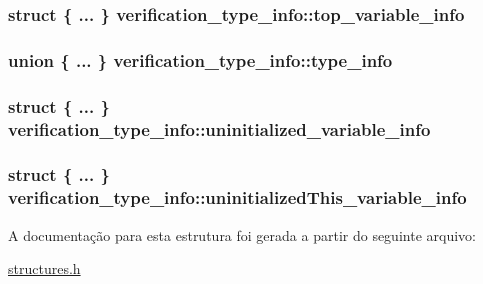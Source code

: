 \subsubsection[{\texorpdfstring{top\+\_\+variable\+\_\+info}{top_variable_info}}]{\setlength{\rightskip}{0pt plus 5cm}struct \{ ... \}   verification\+\_\+type\+\_\+info\+::top\+\_\+variable\+\_\+info}\hypertarget{structverification__type__info_ae8a25f3b3f2824a904c772ecbbd249e1}{}\label{structverification__type__info_ae8a25f3b3f2824a904c772ecbbd249e1}
\subsubsection[{\texorpdfstring{type\+\_\+info}{type_info}}]{\setlength{\rightskip}{0pt plus 5cm}union \{ ... \}   verification\+\_\+type\+\_\+info\+::type\+\_\+info}\hypertarget{structverification__type__info_a694db81e19f00bd3af2cfa2fca4c81d2}{}\label{structverification__type__info_a694db81e19f00bd3af2cfa2fca4c81d2}
\subsubsection[{\texorpdfstring{uninitialized\+\_\+variable\+\_\+info}{uninitialized_variable_info}}]{\setlength{\rightskip}{0pt plus 5cm}struct \{ ... \}   verification\+\_\+type\+\_\+info\+::uninitialized\+\_\+variable\+\_\+info}\hypertarget{structverification__type__info_a732c79b23b52ddb0f77b5e25360d5253}{}\label{structverification__type__info_a732c79b23b52ddb0f77b5e25360d5253}
\subsubsection[{\texorpdfstring{uninitialized\+This\+\_\+variable\+\_\+info}{uninitializedThis_variable_info}}]{\setlength{\rightskip}{0pt plus 5cm}struct \{ ... \}   verification\+\_\+type\+\_\+info\+::uninitialized\+This\+\_\+variable\+\_\+info}\hypertarget{structverification__type__info_a8b83ff57fc01ffdd4f7761af5ab72885}{}\label{structverification__type__info_a8b83ff57fc01ffdd4f7761af5ab72885}


A documentação para esta estrutura foi gerada a partir do seguinte arquivo\+:\begin{DoxyCompactItemize}
\item 
\hyperlink{structures_8h}{structures.\+h}\end{DoxyCompactItemize}
